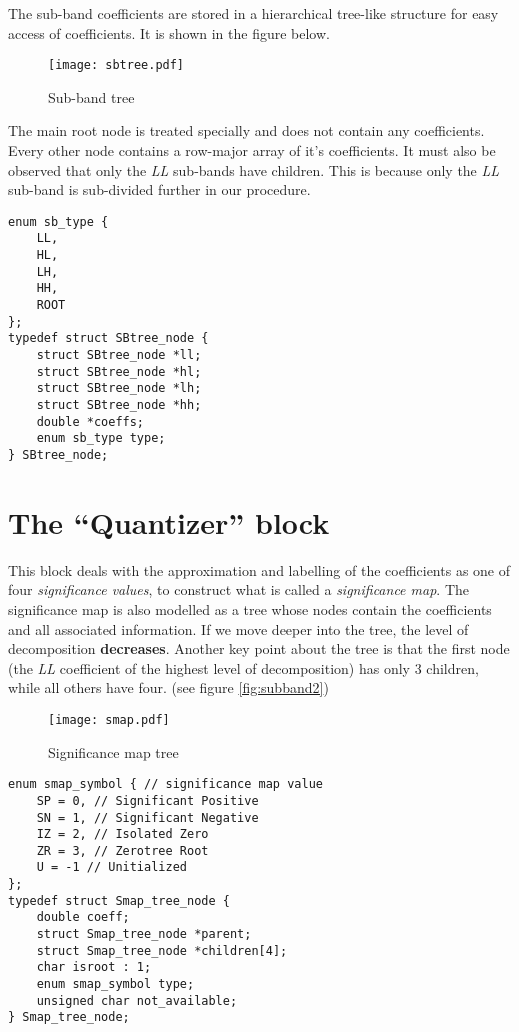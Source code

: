 \documentclass[./A14_Report.tex]{subfiles}
\begin{document}
\pagebreak

The sub-band coefficients are stored in a hierarchical tree-like structure for
easy access of coefficients. It is shown in the figure below.

\begin{figure}[H]
    \centering
    \texttt{[image: sbtree.pdf]}
    \caption{Sub-band tree \cite{libezw}}
    \label{fig:sbtreediag}
\end{figure}

The main root node is treated specially and does not contain any coefficients.
Every other node contains a row-major array of it's coefficients. It must also
be observed that only the \textit{LL} sub-bands have children. This is because
only the \textit{LL} sub-band is sub-divided further in our procedure.
\begin{code}
\begin{verbatim}
enum sb_type {
    LL,
    HL,
    LH,
    HH,
    ROOT
};
typedef struct SBtree_node {
    struct SBtree_node *ll;
    struct SBtree_node *hl;
    struct SBtree_node *lh;
    struct SBtree_node *hh;
    double *coeffs;
    enum sb_type type;
} SBtree_node;
\end{verbatim}
\caption{\texttt{C struct} representation of the tree shown in figure \ref{fig:sbtreediag} \cite{libezw}}
    \label{code:sbtreedef}
\end{code}

\section{The ``Quantizer'' block}
This block deals with the approximation and labelling of the coefficients as
one of four \textit{significance values}, to construct what is called a
\textit{significance map}. The significance map is also modelled as a tree
whose nodes contain the coefficients and all associated information. If we move
deeper into the tree, the level of decomposition \textbf{decreases}. Another
key point about the tree is that the first node (the \textit{LL} coefficient of
the highest level of decomposition) has only 3 children, while all others have
four. (see figure \ref{fig:subband2})

\begin{figure}[H]
    \centering
    \texttt{[image: smap.pdf]}
    \caption{Significance map tree \cite{libezw}}
    \label{fig:smaptreediag}
\end{figure}

\begin{code}
\begin{verbatim}
enum smap_symbol { // significance map value
    SP = 0, // Significant Positive
    SN = 1, // Significant Negative
    IZ = 2, // Isolated Zero
    ZR = 3, // Zerotree Root
    U = -1 // Unitialized
};
typedef struct Smap_tree_node {
    double coeff;
    struct Smap_tree_node *parent;
    struct Smap_tree_node *children[4];
    char isroot : 1;
    enum smap_symbol type;
    unsigned char not_available;
} Smap_tree_node;
\end{verbatim}
\caption{\texttt{C struct} representation of the tree shown in figure \ref{fig:smaptreediag} \cite{libezw}}
    \label{code:sbtreedef}
\end{code}
\end{document}
